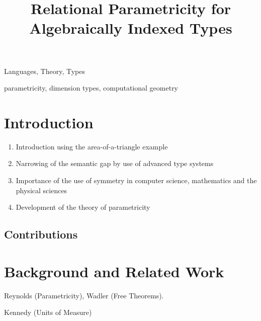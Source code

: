 \documentclass[natbib,preprint]{sigplanconf}
\title{Relational Parametricity for Algebraically Indexed Types}
\begin{document}
\maketitle

\begin{abstract}
  
\end{abstract}

  

\terms
  Languages, Theory, Types

\keywords
  parametricity, dimension types, computational geometry

\section{Introduction}

\begin{enumerate}
\item Introduction using the area-of-a-triangle example
\item Narrowing of the semantic gap by use of advanced type systems
\item Importance of the use of symmetry in computer science,
  mathematics and the physical sciences
\item Development of the theory of parametricity
\end{enumerate}

\subsection{Contributions}


\section{Background and Related Work}

Reynolds (Parametricity), Wadler (Free Theorems).

Kennedy (Units of Measure)
\end{document}
